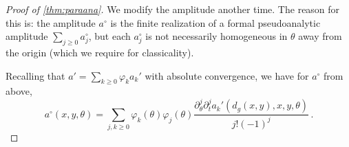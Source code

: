 \documentclass[
	fontsize=11pt, 
	twoside=false, 
	abstract=true, 
	a4paper,
]{scrartcl}
\newcommand{\dd}{\mathrm{d}}
\newcommand{\abs}[1]{\left\lvert#1\right\rvert}
\newcommand{\del}{\partial}
\begin{document}
\begin{proof}[Proof of \cref{thm:paraana}]
%
	We modify the amplitude another time. The reason for this is: the amplitude $a^{\circ}$ is the finite realization of a formal pseudoanalytic amplitude $\sum_{j\geq 0} a^{\circ}_j$, but each $a^{\circ}_j$ is not necessarily homogeneous in $\theta$ away from the origin (which we require for classicality).

	Recalling that $a' = \sum_{k\geq 0} \varphi_k a_k'$ with absolute convergence, we have for $a^\circ$ from above,
	\[
		a^{\circ}(x,y,\theta)= \sum_{j,k\geq 0} \varphi_k(\theta)\varphi_j(\theta)\frac{\del_\theta^j\del_t^j a_k'(d_g(x,y),x,y,\theta)}{j!(-1)^j}\,.
	\]


\end{proof}
\end{document}
